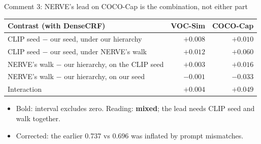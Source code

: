 \begin{frame}{Comment 3: NERVE's lead on COCO-Cap is the combination, not either part}
\begin{slidetable}
\begin{tabular}{lrr}
\toprule
Contrast (with DenseCRF) & VOC-Sim & COCO-Cap \\
\midrule
CLIP seed $-$ our seed, under our hierarchy       & $+0.008$ & $+0.010$ \\
CLIP seed $-$ our seed, under NERVE's walk        & $+0.012$ & $\mathbf{+0.060}$ \\
NERVE's walk $-$ our hierarchy, on the CLIP seed  & $+0.003$ & $\mathbf{+0.016}$ \\
NERVE's walk $-$ our hierarchy, on our seed       & $-0.001$ & $\mathbf{-0.033}$ \\
Interaction                                       & $+0.004$ & $\mathbf{+0.049}$ \\
\bottomrule
\end{tabular}
\end{slidetable}
\begin{itemize}
  \item Bold: interval excludes zero. Reading: \textbf{mixed}; the lead needs CLIP seed and walk together.
  \item Corrected: the earlier 0.737 vs 0.696 was inflated by prompt mismatches.
\end{itemize}
\end{frame}
